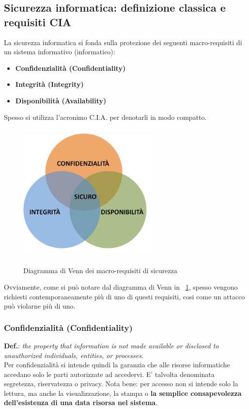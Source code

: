 \subsection{Sicurezza informatica: definizione classica e requisiti CIA}
La sicurezza informatica si fonda sulla protezione dei seguenti macro-requisiti di un sistema informativo (informatico):
\begin{itemize} 
  \item \textbf{Confidenzialità (Confidentiality)}
  \item \textbf{Integrità (Integrity)}
  \item \textbf{Disponibilità (Availability)}
\end{itemize}
Spesso si utilizza l’acronimo C.I.A. per denotarli in modo compatto.
\begin{figure}[htbp]
	\centering%
	\subfigure%
	{\includegraphics[height=7cm, width=7cm, keepaspectratio]{Immagini/introduzione/venn_security}}
	\caption{Diagramma di Venn dei macro-requisiti di sicurezza \label{fig:venn_security}} 	
\end{figure}
Ovviamente, come si può notare dal diagramma di Venn in \figurename ~\ref{fig:venn_security}, spesso vengono richiesti contemporaneamente più di uno di questi requisiti, cosi come un attacco può violarne più di uno.

\subsubsection{Confidenzialità (Confidentiality)}
\textbf{Def.}: \textit{the property that information is not made available or disclosed to unauthorized individuals, entities, or processes.} \\

Per confidenzialità si intende quindi la garanzia che alle risorse informatiche accedano solo le parti autorizzate ad accedervi. E' talvolta denominata segretezza, riservatezza o privacy. Nota bene: per accesso non si intende solo la lettura, ma anche la visualizzazione, la stampa o \textbf{la semplice consapevolezza dell'esistenza di una data risorsa nel sistema}.\newline

